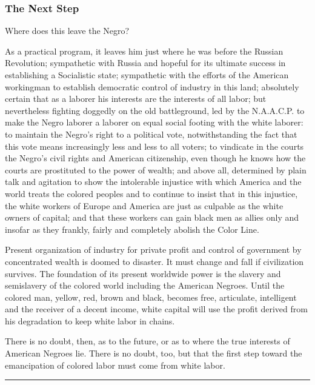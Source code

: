 \documentclass[letterpaper,10pt,english]{jupyterBook}
\begin{document}
\subsubsection{The Next Step}
\label{\detokenize{Volumes/38/09/negro_and_communism:the-next-step}}
\sphinxAtStartPar
Where does this leave the Negro?

\sphinxAtStartPar
As a practical program, it leaves him just where he was before the Russian Revolution; sympathetic with Russia and hopeful for its ultimate success in establishing a Socialistic state; sympathetic with the efforts of the American workingman to establish democratic control of industry in this land; absolutely certain that as a laborer his interests are the interests of all labor; but nevertheless fighting doggedly on the old battleground, led by the N.A.A.C.P. to make the Negro laborer a laborer on equal social footing with the white laborer: to maintain the Negro’s right to a political vote, notwithstanding the fact that this vote means increasingly less and less to all voters; to vindicate in the courts the Negro’s civil rights and American citizenship, even though he knows how the courts are prostituted to the power of wealth; and above all, determined by plain talk and agitation to show the intolerable injustice with which America and the world treats the colored peoples and to continue to insist that in this injustice, the white workers of Europe and America are just as culpable as the white owners of capital; and that these workers can gain black men as allies only and insofar as they frankly, fairly and completely abolish the Color Line.

\sphinxAtStartPar
Present organization of industry for private profit and control of government by concentrated wealth is doomed to disaster. It must change and fall if civilization survives. The foundation of its present world\sphinxhyphen{}wide power is the slavery and semislavery of the colored world including the American Negroes. Until the colored man, yellow, red, brown and black, becomes free, articulate, intelligent and the receiver of a decent income, white capital will use the profit derived from his degradation to keep white labor in chains.

\sphinxAtStartPar
There is no doubt, then, as to the future, or as to where the true interests of American Negroes lie. There is no doubt, too, but that the first step toward the emancipation of colored labor must come from white labor.


\bigskip\hrule\bigskip
\end{document}

